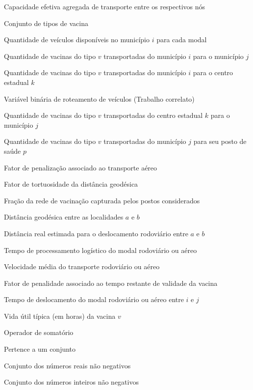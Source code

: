 \begin{simbolos}
\item[$u_{ij}, u_{ik}, u_{kj}$] Capacidade efetiva agregada de transporte entre os respectivos nós
\item[$V$] Conjunto de tipos de vacina
\item[$W_i^{rod}, W_i^{aereo}$] Quantidade de veículos disponíveis no município $i$ para cada modal
\item[$x_{ijv}$] Quantidade de vacinas do tipo $v$ transportadas do município $i$ para o município $j$
\item[$x_{ikv}$] Quantidade de vacinas do tipo $v$ transportadas do município $i$ para o centro estadual $k$
\item[$x_{ij}^s$] Variável binária de roteamento de veículos (Trabalho correlato)
\item[$y_{kjv}$] Quantidade de vacinas do tipo $v$ transportadas do centro estadual $k$ para o município $j$
\item[$z_{jpv}$] Quantidade de vacinas do tipo $v$ transportadas do município $j$ para seu posto de saúde $p$

\item[$\alpha$] Fator de penalização associado ao transporte aéreo
\item[$\beta$] Fator de tortuosidade da distância geodésica
\item[$\gamma$] Fração da rede de vacinação capturada pelos postos considerados
\item[$\Delta_{ab}$] Distância geodésica entre as localidades $a$ e $b$
\item[$\Delta_{ab}^{real}$] Distância real estimada para o deslocamento rodoviário entre $a$ e $b$
\item[$\delta^{rod}, \delta^{aereo}$] Tempo de processamento logístico do modal rodoviário ou aéreo
\item[$\theta_{rod}, \theta_{aereo}$] Velocidade média do transporte rodoviário ou aéreo
\item[$\rho_{iv}, \rho_{jv}$] Fator de penalidade associado ao tempo restante de validade da vacina
\item[$\tau_{ij}^{rod}, \tau_{ij}^{aereo}$] Tempo de deslocamento do modal rodoviário ou aéreo entre $i$ e $j$
\item[$\Omega_v$] Vida útil típica (em horas) da vacina $v$

\item[$\sum$] Operador de somatório
\item[$\in$] Pertence a um conjunto
\item[$\mathbb{R}_{\ge 0}$] Conjunto dos números reais não negativos
\item[$\mathbb{Z}_{\ge 0}$] Conjunto dos números inteiros não negativos
\end{simbolos}